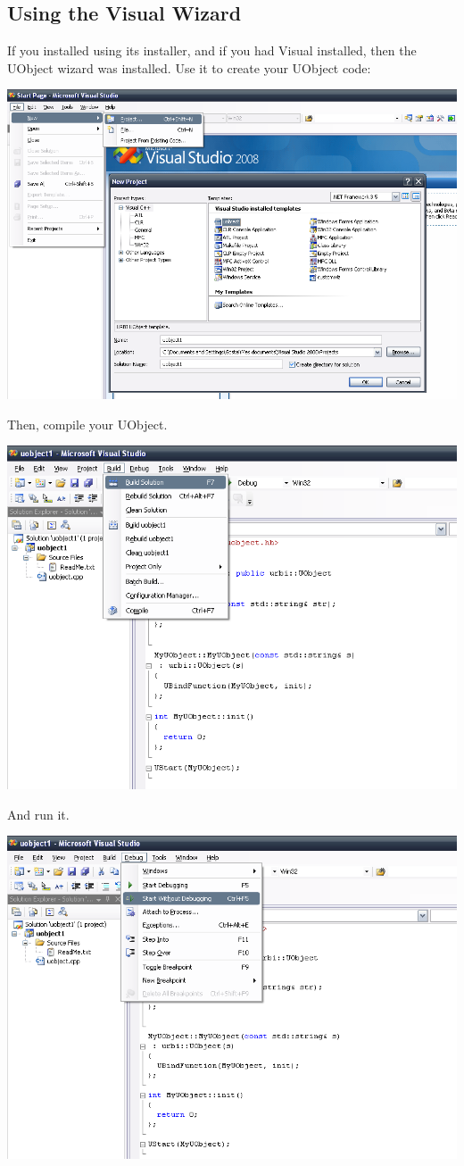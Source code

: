 \subsection{Using the Visual \Cxx Wizard}

If you installed \usdk using its installer, and if you had Visual \Cxx
installed, then the UObject wizard was installed.  Use it to create your
UObject code:

\begin{center}
  \includegraphics[width=0.6\linewidth]{img/visual-wizard-1}
\end{center}

Then, compile your UObject.

\begin{center}
  \includegraphics[width=0.6\linewidth]{img/visual-wizard-2}
\end{center}

And run it.

\begin{center}
  \includegraphics[width=0.6\linewidth]{img/visual-wizard-3}
\end{center}


